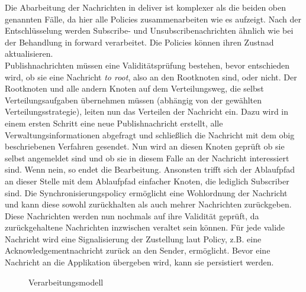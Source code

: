 Die Abarbeitung der Nachrichten in deliver ist komplexer als die beiden oben genannten Fälle, da hier alle Policies zusammenarbeiten wie es  aufzeigt. Nach der Entschlüsselung werden Subscribe- und Unsubscribenachrichten ähnlich wie bei der Behandlung in forward verarbeitet. Die Policies können ihren Zustnad aktualisieren.\\
Publishnachrichten müssen eine Validitätsprüfung bestehen, bevor entschieden wird, ob sie eine Nachricht \emph{to root}, also an den Rootknoten sind, oder nicht. Der Rootknoten und alle andern Knoten auf dem Verteilungsweg, die selbst Verteilungsaufgaben übernehmen müssen (abhängig von der gewählten Verteilungsstrategie), leiten nun das Verteilen der Nachricht ein. Dazu wird in einem ersten Schritt eine neue Publishnachricht erstellt, alle Verwaltungsinformationen abgefragt und schließlich die Nachricht mit dem obig beschriebenen Verfahren gesendet. Nun wird an diesen Knoten geprüft ob sie selbst angemeldet sind und ob sie in diesem Falle an der Nachricht interessiert sind. Wenn nein, so endet die Bearbeitung. Ansonsten trifft sich der Ablaufpfad an dieser Stelle mit dem Ablaufpfad einfacher Knoten, die lediglich Subscriber sind. Die Synchronisierungspolicy ermöglicht eine Wohlordnung der Nachricht und kann diese sowohl zurückhalten als auch mehrer Nachrichten zurückgeben. Diese Nachrichten werden nun nochmals auf ihre Validität geprüft, da zurückgehaltene Nachrichten inzwischen veraltet sein können. Für jede valide Nachricht wird eine Signalisierung der Zustellung laut Policy, z.B. eine Acknowledgementnachricht zurück an den Sender, ermöglicht. Bevor eine Nachricht an die Applikation übergeben wird, kann sie persistiert werden.

\begin{figure}[htbp]
\centering
{}
\caption{Verarbeitungsmodell}
\label{fig:processing_deliver}
\end{figure}


